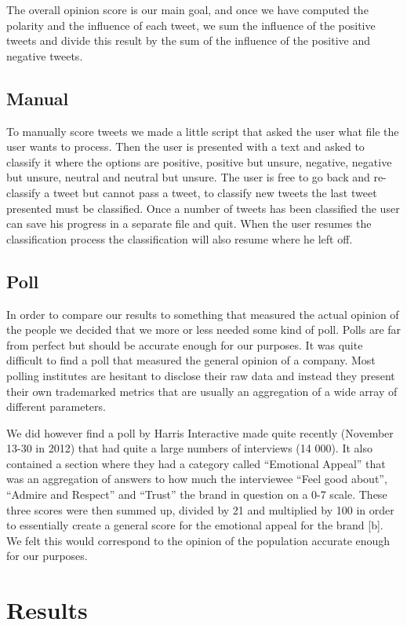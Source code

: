 \documentclass[a4paper,12pt]{report}
\begin{document}
The overall opinion score is our main goal, and once we have computed the polarity and the influence of each tweet, we sum the influence of the positive tweets and divide this result by the sum of the influence of the positive and negative tweets.

\section{Manual}
To manually score tweets we made a little script that asked the user what file the user wants to process. 
Then the user is presented with a text and asked to classify it where the options are positive, positive but unsure, negative, negative but unsure, neutral and neutral but unsure. 
The user is free to go back and re-classify a tweet but cannot pass a tweet, to classify new tweets the last tweet presented must be classified. 
Once a number of tweets has been classified the user can save his progress in a separate file and quit. 
When the user resumes the classification process the classification will also resume where he left off.

\section{Poll}
In order to compare our results to something that measured the actual opinion of the people we decided that we more or less needed some kind of poll. 
Polls are far from perfect but should be accurate enough for our purposes. It was quite difficult to find a poll that measured the general opinion of a company. 
Most polling institutes are hesitant to disclose their raw data and instead they present their own trademarked metrics that are usually an aggregation of a wide array of different parameters.

We did however find a poll by Harris Interactive made quite recently (November 13-30 in 2012) that had quite a large numbers of interviews (14 000). 
It also contained a section where they had a category called “Emotional Appeal” that was an aggregation of answers to how much the interviewee “Feel good about”, “Admire and Respect” and “Trust” the brand in question on a 0-7 scale. 
These three scores were then summed up, divided by 21 and multiplied by 100 in order to essentially create a general score for the emotional appeal for the brand [b]. 
We felt this would correspond to the opinion of the population accurate enough for our purposes.

\chapter{Results}
\end{document}
